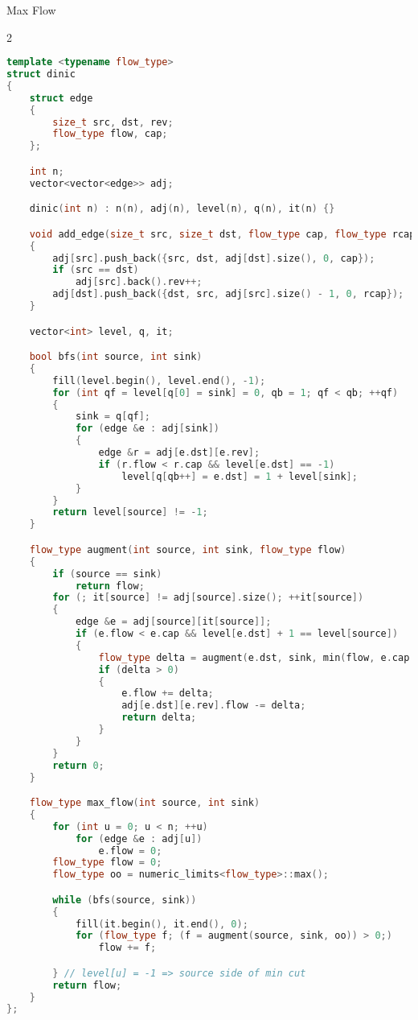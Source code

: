 \documentclass[leter]{amsart}
\begin{document}
Max Flow
\begin{multicols}{2}
\begin{lstlisting}[language=C++]
template <typename flow_type>
struct dinic
{
    struct edge
    {
        size_t src, dst, rev;
        flow_type flow, cap;
    };

    int n;
    vector<vector<edge>> adj;

    dinic(int n) : n(n), adj(n), level(n), q(n), it(n) {}

    void add_edge(size_t src, size_t dst, flow_type cap, flow_type rcap = 0)
    {
        adj[src].push_back({src, dst, adj[dst].size(), 0, cap});
        if (src == dst)
            adj[src].back().rev++;
        adj[dst].push_back({dst, src, adj[src].size() - 1, 0, rcap});
    }

    vector<int> level, q, it;

    bool bfs(int source, int sink)
    {
        fill(level.begin(), level.end(), -1);
        for (int qf = level[q[0] = sink] = 0, qb = 1; qf < qb; ++qf)
        {
            sink = q[qf];
            for (edge &e : adj[sink])
            {
                edge &r = adj[e.dst][e.rev];
                if (r.flow < r.cap && level[e.dst] == -1)
                    level[q[qb++] = e.dst] = 1 + level[sink];
            }
        }
        return level[source] != -1;
    }

    flow_type augment(int source, int sink, flow_type flow)
    {
        if (source == sink)
            return flow;
        for (; it[source] != adj[source].size(); ++it[source])
        {
            edge &e = adj[source][it[source]];
            if (e.flow < e.cap && level[e.dst] + 1 == level[source])
            {
                flow_type delta = augment(e.dst, sink, min(flow, e.cap - e.flow));
                if (delta > 0)
                {
                    e.flow += delta;
                    adj[e.dst][e.rev].flow -= delta;
                    return delta;
                }
            }
        }
        return 0;
    }

    flow_type max_flow(int source, int sink)
    {
        for (int u = 0; u < n; ++u)
            for (edge &e : adj[u])
                e.flow = 0;
        flow_type flow = 0;
        flow_type oo = numeric_limits<flow_type>::max();

        while (bfs(source, sink))
        {
            fill(it.begin(), it.end(), 0);
            for (flow_type f; (f = augment(source, sink, oo)) > 0;)
                flow += f;

        } // level[u] = -1 => source side of min cut
        return flow;
    }
};

\end{lstlisting}
\end{multicols}
\end{document}
